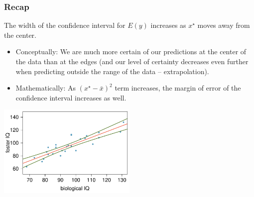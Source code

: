 \documentclass[11pt,containsverbatim,handout,xcolor=xelatex,dvipsnames,table]{beamer}
\begin{document}
\begin{frame}[fragile]
\frametitle{}

 
{
}
{
}


\end{frame}



\begin{frame}
\frametitle{Recap}

\vspace{-0.25cm}

The width of the confidence interval for $E(y)$ increases as $x^\star$ moves away from the center.

\begin{itemize}

\item Conceptually: We are much more certain of our predictions at the center of the data than at the edges (and our level of certainty decreases even further when predicting outside the range of the data -- extrapolation).

\item Mathematically: As $(x^\star - \bar{x})^2$ term increases, the margin of error of the confidence interval increases as well.

\end{itemize}

\begin{center}
\includegraphics[width=0.5\textwidth]{figures/twins/twins_IQ_cint}
\end{center}

\end{frame}
\end{document}
